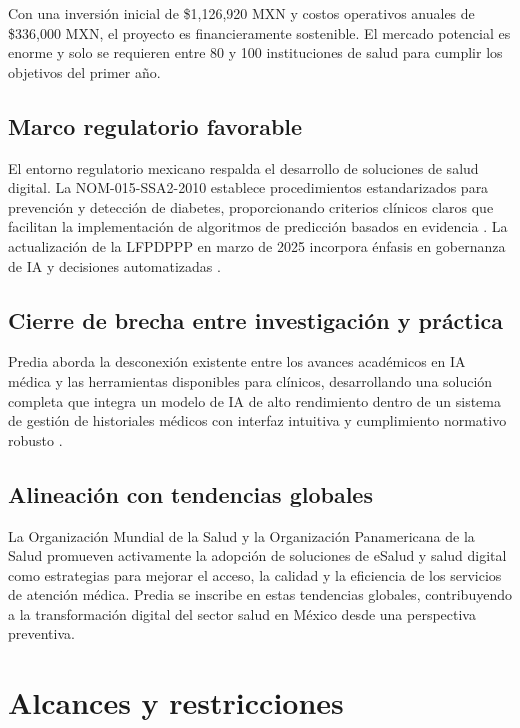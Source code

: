 \documentclass[12pt, letterpaper, twoside]{report}
\begin{document}
Con una inversión inicial de \$1{,}126{,}920 MXN y costos operativos anuales de \$336{,}000 MXN, el proyecto es financieramente sostenible. El mercado potencial es enorme y solo se requieren entre 80 y 100 instituciones de salud para cumplir los objetivos del primer año.

\subsection{Marco regulatorio favorable}

El entorno regulatorio mexicano respalda el desarrollo de soluciones de salud digital. La NOM-015-SSA2-2010 establece procedimientos estandarizados para prevención y detección de diabetes, proporcionando criterios clínicos claros que facilitan la implementación de algoritmos de predicción basados en evidencia \citep{nom015}. La actualización de la LFPDPPP en marzo de 2025 incorpora énfasis en gobernanza de IA y decisiones automatizadas \citep{lfpdppp2025}.

\subsection{Cierre de brecha entre investigación y práctica}

Predia aborda la desconexión existente entre los avances académicos en IA médica y las herramientas disponibles para clínicos, desarrollando una solución completa que integra un modelo de IA de alto rendimiento dentro de un sistema de gestión de historiales médicos con interfaz intuitiva y cumplimiento normativo robusto \citep{contreras2018, kavakiotis2017}.

\subsection{Alineación con tendencias globales}

La Organización Mundial de la Salud y la Organización Panamericana de la Salud promueven activamente la adopción de soluciones de eSalud y salud digital como estrategias para mejorar el acceso, la calidad y la eficiencia de los servicios de atención médica. Predia se inscribe en estas tendencias globales, contribuyendo a la transformación digital del sector salud en México desde una perspectiva preventiva.

\section{Alcances y restricciones}
\end{document}
